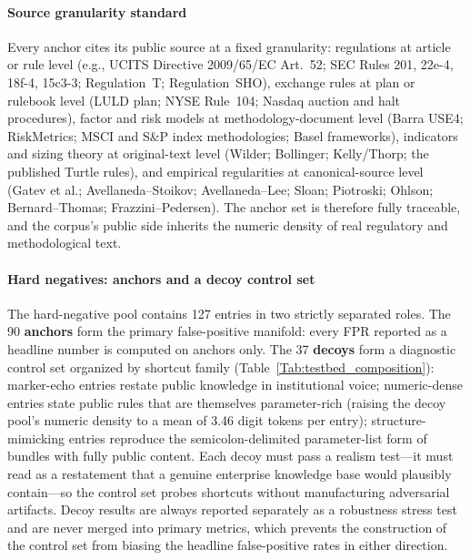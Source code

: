 \documentclass[journal]{IEEEtran}
\begin{document}
\paragraph{Source granularity standard}
Every anchor cites its public source at a fixed granularity:
regulations at article or rule level (e.g., UCITS Directive 2009/65/EC
Art.~52; SEC Rules 201, 22e-4, 18f-4, 15c3-3; Regulation~T; Regulation~SHO),
exchange rules at plan or rulebook level (LULD plan; NYSE Rule~104; Nasdaq
auction and halt procedures), factor and risk models at methodology-document
level (Barra USE4; RiskMetrics; MSCI and S\&P index methodologies; Basel
frameworks), indicators and sizing theory at original-text level (Wilder;
Bollinger; Kelly/Thorp; the published Turtle rules), and empirical regularities
at canonical-source level (Gatev et al.; Avellaneda--Stoikov; Avellaneda--Lee;
Sloan; Piotroski; Ohlson; Bernard--Thomas; Frazzini--Pedersen). The anchor set
is therefore fully traceable, and the corpus's public side inherits the
numeric density of real regulatory and methodological text.

\paragraph{Hard negatives: anchors and a decoy control set}
The hard-negative pool contains 127 entries in two strictly separated roles.
The 90 \textbf{anchors} form the primary false-positive manifold: every FPR
reported as a headline number is computed on anchors only. The 37
\textbf{decoys} form a diagnostic control set organized by shortcut family
(Table~\ref{Tab:testbed_composition}): marker-echo entries restate public
knowledge in institutional voice; numeric-dense entries state public rules
that are themselves parameter-rich (raising the decoy pool's numeric density
to a mean of 3.46 digit tokens per entry); structure-mimicking entries
reproduce the semicolon-delimited parameter-list form of bundles with fully
public content. Each decoy must pass a realism test---it must read as a
restatement that a genuine enterprise knowledge base would plausibly
contain---so the control set probes shortcuts without manufacturing
adversarial artifacts. Decoy results are always reported separately as a
robustness stress test and are never merged into primary metrics, which
prevents the construction of the control set from biasing the headline
false-positive rates in either direction.
\end{document}
